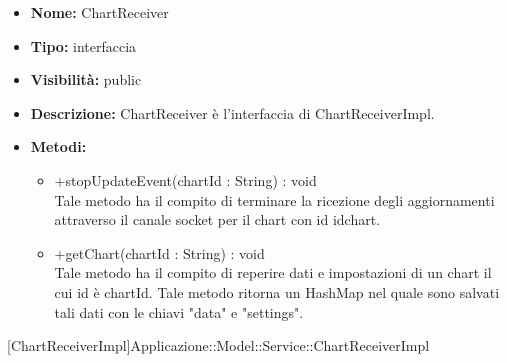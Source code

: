			
			\begin{itemize}
			\item \textbf{Nome:} ChartReceiver
			\item \textbf{Tipo:} interfaccia
			
			\item \textbf{Visibilità:} public
			\item \textbf{Descrizione:} ChartReceiver è l'interfaccia di ChartReceiverImpl.
			\item \textbf{Metodi:}
				\begin{itemize}
				\setlength{\itemsep}{5pt}
				
					\item[\ding{111}] {{+stopUpdateEvent(chartId : String) : void}} \\ [1mm] Tale metodo ha il compito di terminare la ricezione degli aggiornamenti attraverso il canale socket per il chart con id idchart.
					\item[\ding{111}] {{+getChart(chartId : String) : void}} \\ [1mm] Tale metodo ha il compito di reperire dati e impostazioni di un chart il cui id è chartId. Tale metodo ritorna un HashMap nel quale sono salvati tali dati con le chiavi "data" e "settings".
				\end{itemize}
		
			\end{itemize}

			
			[ChartReceiverImpl]{Applicazione::Model::Service::ChartReceiverImpl}
			

	
